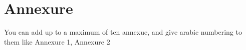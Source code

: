 \chapter*{Annexure}
You can add up to a maximum of ten annexue, and give arabic numbering to them
like Annexure 1,  Annexure 2
\newpage
